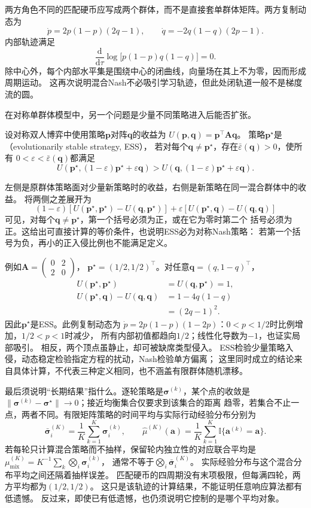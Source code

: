 两方角色不同的匹配硬币应写成两个群体，而不是直接套单群体矩阵。两方复制动态为
\[
  \dot p=2p(1-p)(2q-1),\qquad
  \dot q=-2q(1-q)(2p-1).
\]
内部轨迹满足
\[
  \frac{\mathrm d}{\mathrm d\tau}
  \log\!\bigl[p(1-p)q(1-q)\bigr]=0.
\]
除中心外，每个内部水平集是围绕中心的闭曲线，向量场在其上不为零，因而形成周期运动。
这再次说明混合Nash不必吸引学习轨迹，但此处闭轨道一般不是梯度流的圆。

在对称单群体模型中，另一个问题是少量不同策略进入后能否扩张。
\begin{definition}[演化稳定策略]
\label{def:game-evolutionarily-stable}
设对称双人博弈中使用策略\(\bm p\)对阵\(\bm q\)的收益为
\(U(\bm p,\bm q)=\bm p^\top\bm A\bm q\)。
策略\(\bm p^\star\)是（evolutionarily stable strategy, ESS），
若对每个\(\bm q\ne\bm p^\star\)，存在\(\bar\varepsilon(\bm q)>0\)，使所有
\(0<\varepsilon<\bar\varepsilon(\bm q)\)都满足
\[
  U(\bm p^\star,(1-\varepsilon)\bm p^\star+\varepsilon\bm q)
  >
  U(\bm q,(1-\varepsilon)\bm p^\star+\varepsilon\bm q).
\]
\end{definition}
左侧是原群体策略面对少量新策略时的收益，右侧是新策略在同一混合群体中的收益。
将两侧之差展开为
\[
  (1-\varepsilon)
  [U(\bm p^\star,\bm p^\star)-U(\bm q,\bm p^\star)]
  +\varepsilon[U(\bm p^\star,\bm q)-U(\bm q,\bm q)]
\]
可见，对每个\(\bm q\ne\bm p^\star\)，第一个括号必须为正，或在它为零时第二个
括号必须为正。这给出可直接计算的等价条件，也说明ESS必为对称Nash策略：
若第一个括号为负，再小的正入侵比例也不能满足定义。

例如\(\bm A=\left(\begin{smallmatrix}0&2\\2&0\end{smallmatrix}\right)\)，
\(\bm p^\star=(1/2,1/2)^\top\)。对任意\(\bm q=(q,1-q)^\top\)，
\[
  \begin{aligned}
    U(\bm p^\star,\bm p^\star)&=U(\bm q,\bm p^\star)=1,\\
    U(\bm p^\star,\bm q)-U(\bm q,\bm q)&=1-4q(1-q)\\
      &=(2q-1)^2.
  \end{aligned}
\]
因此\(\bm p^\star\)是ESS。此例复制动态为
\(\dot p=2p(1-p)(1-2p)\)：\(0<p<1/2\)时比例增加，\(1/2<p<1\)时减少，
所有内部初值都趋向\(1/2\)；线性化导数为\(-1\)，也证实局部吸引。
相反，两个顶点虽静止，却可被缺席类型侵入。
ESS检验少量策略入侵，动态稳定检验指定方程的扰动，Nash检验单方偏离；
这里同时成立的结论来自具体计算，不代表三种定义相同，也不涵盖有限群体随机漂移。

最后须说明“长期结果”指什么。逐轮策略是\(\bm\sigma^{(k)}\)，某个点的收敛是
\(\|\bm\sigma^{(k)}-\bm\sigma^\star\|\to0\)；接近均衡集合仅要求到该集合的距离
趋零，若集合不止一点，两者不同。有限矩阵策略的时间平均与实际行动经验分布分别为
\[
  \bar{\bm\sigma}_i^{(K)}
  =\frac1K\sum_{k=1}^K\bm\sigma_i^{(k)},\qquad
  \widehat\mu^{(K)}(\bm a)
  =\frac1K\sum_{k=1}^K\mathbb I\{\bm a^{(k)}=\bm a\}.
\]
若每轮只计算混合策略而不抽样，保留轮内独立性的对应联合平均是
\(\mu_{\mathrm{mix}}^{(K)}=K^{-1}\sum_k\bigotimes_i\bm\sigma_i^{(k)}\)，
通常不等于\(\bigotimes_i\bar{\bm\sigma}_i^{(K)}\)。
实际经验分布与这个混合分布平均之间还隔着抽样误差。
匹配硬币的四周期没有末项极限，但每满四轮，两方平均都为\((1/2,1/2)\)。
这只是该轨迹的计算结果，不能证明任意响应算法都有低遗憾。
反过来，即使已有低遗憾，也仍须说明它控制的是哪个平均对象。

